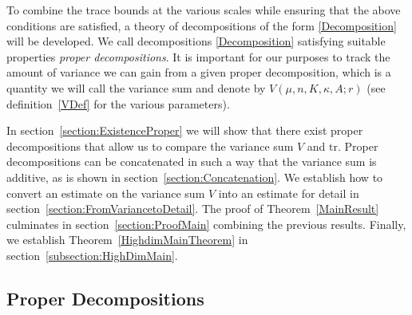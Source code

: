 \documentclass[10pt, english,oneside,reqno]{amsart}
\theoremstyle{plain}
\theoremstyle{remark}
\numberwithin{equation}{section}
\numberwithin{figure}{section}
\begin{document}
To combine the trace bounds at the various scales while ensuring that the above conditions are satisfied, a theory of decompositions of the form \eqref{Decomposition} will be developed. We call decompositions \eqref{Decomposition} satisfying suitable properties \textit{proper decompositions}. It is important for our purposes to track the amount of variance we can gain from a given proper decomposition, which is a quantity we will call the variance sum and  denote by $V(\mu,n,K,\kappa,A;r)$ (see definition~\ref{VDef} for the various parameters).

In section~\ref{section:ExistenceProper} we will show that there exist proper decompositions that allow us to compare the variance sum $V$ and $\mathrm{tr}$. Proper decompositions can be concatenated in such a way that the variance sum is additive, as is shown in section~\ref{section:Concatenation}. We establish how to convert an estimate on the variance sum $V$ into an estimate for detail in section~\ref{section:FromVariancetoDetail}. The proof of Theorem~\ref{MainResult} culminates in section~\ref{section:ProofMain} combining the previous results. Finally, we establish Theorem~\ref{HighdimMainTheorem} in section~\ref{subsection:HighDimMain}.


\subsection{Proper Decompositions}
\end{document}
